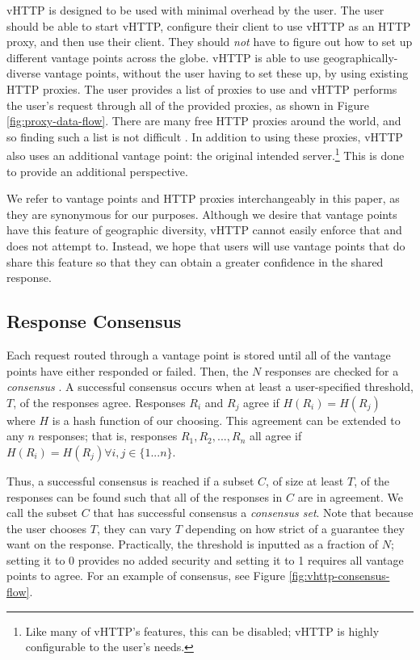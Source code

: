 vHTTP is designed to be used with minimal overhead by the user. The user should
be able to start vHTTP, configure their client to use vHTTP as an HTTP proxy,
and then use their client. They should \emph{not} have to figure out how to set
up different vantage points across the globe. vHTTP is able to use
geographically-diverse vantage points, without the user having to set these up,
by using existing HTTP proxies. The user provides a list of proxies to use and
vHTTP performs the user's request through all of the provided proxies, as shown
in Figure \ref{fig:proxy-data-flow}. There are many free HTTP proxies around
the world, and so finding such a list is not difficult
\cite{HideMyName-Proxies, NordVPN-Proxies, FreeProxyList}. In addition to using
these proxies, vHTTP also uses an additional vantage point: the original
intended server.\footnote{
  Like many of vHTTP's features, this can be disabled; vHTTP is highly
  configurable to the user's needs.}
This is done to provide an additional perspective.

We refer to vantage points and HTTP proxies interchangeably in this paper, as
they are synonymous for our purposes. Although we desire that vantage points
have this feature of geographic diversity, vHTTP cannot easily enforce that
and does not attempt to. Instead, we hope that users will use vantage points
that do share this feature so that they can obtain a greater confidence in the
shared response.



\subsection{Response Consensus}

Each request routed through a vantage point is stored until all of the
vantage points have either responded or failed. Then, the $N$ responses are
checked for a \textit{consensus} \cite{Perspectives}. A successful consensus
occurs when at least a user-specified threshold, $T$, of the responses agree.
Responses $R_i$ and $R_j$ agree if $H(R_i) = H(R_j)$ where $H$ is a hash
function of our choosing. This agreement can be extended to any $n$ responses;
that is, responses $R_1, R_2, ..., R_n$ all agree if
$H(R_i) = H(R_j) \forall i, j \in \{1...n\}$.

Thus, a successful consensus is reached if a subset $C$, of size at least $T$,
of the responses can be found such that all of the responses in $C$ are in
agreement. We call the subset $C$ that has successful consensus a
\textit{consensus set}. Note that because the user chooses $T$, they can vary
$T$ depending on how strict of a guarantee they want on the response.
Practically, the threshold is inputted as a fraction of $N$; setting it to 0
provides no added security and setting it to 1 requires all vantage points to
agree. For an example of consensus, see Figure \ref{fig:vhttp-consensus-flow}.

